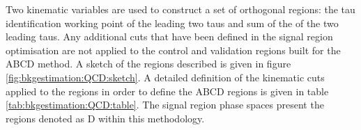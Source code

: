Two kinematic variables are used to construct a set of orthogonal regions: the tau identification working point of the leading two taus and sum of the \Mt of the two leading taus.
Any additional cuts that have been defined in the signal region optimisation are not applied to the control and validation regions built for the ABCD method. 
A sketch of the regions described is given in figure \ref{fig:bkgestimation:QCD:sketch}.
A detailed definition of the kinematic cuts applied to the regions in order to define the ABCD regions is given in table \ref{tab:bkgestimation:QCD:table}. The signal region phase spaces present the regions denoted as D within this methodology. \\

